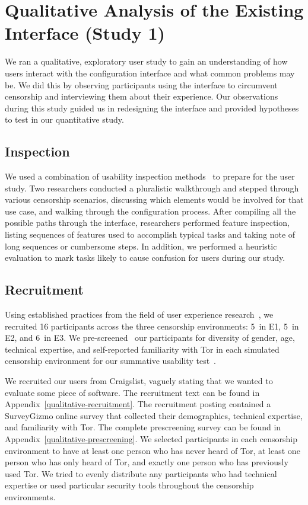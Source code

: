 \documentclass[USenglish,oneside,twocolumn]{article}
\begin{document}
\section{Qualitative Analysis of the Existing Interface (Study 1)}
\label{sec:qualitative}

We ran a qualitative, exploratory user study to gain an 
understanding of how users interact with the configuration interface and
what common problems may be. We did this by observing participants using 
the interface to circumvent censorship and interviewing them about
their experience.  Our observations during this study guided us in
redesigning the interface and provided hypotheses to test in our quantitative study.

\subsection{Inspection}
We used a combination of usability inspection methods~\cite{nielsen1994usability}
to prepare for the user study. Two researchers conducted a pluralistic 
walkthrough and stepped through various censorship
scenarios, discussing which elements would be involved for that use case, and walking 
through the configuration process. After compiling all the possible paths through the 
interface, researchers performed feature inspection, listing sequences of features used 
to accomplish typical tasks and taking note of long sequences or cumbersome
steps. In addition, we performed a heuristic evaluation to mark tasks
likely to cause confusion for users during our study. 

\subsection{Recruitment}
Using established practices from the field of user experience research~\cite{howmanyusers},
we recruited 16 participants across the three censorship environments:
5~in E1, 5~in E2, and 6~in E3.
We pre-screened~\cite{screening} our participants for diversity of gender, age, technical expertise,
and self-reported familiarity with Tor in each simulated censorship environment for our summative
usability test~\cite{summative}. 

We recruited our users from Craigslist, vaguely stating that we wanted to evaluate some piece of software. 
The recruitment text can be found in Appendix~\ref{qualitative-recruitment}. The recruitment posting contained a 
SurveyGizmo online survey that collected their demographics, technical expertise, and familiarity with Tor.
The complete prescreening survey can be found in Appendix~\ref{qualitative-prescreening}.  
We selected participants in each censorship environment to have at least one person who has never heard of Tor, 
at least one person who has only heard of Tor, and exactly one person who has previously used Tor. We tried to evenly distribute any participants who had technical
expertise or used particular security tools throughout the censorship environments. 
\end{document}
